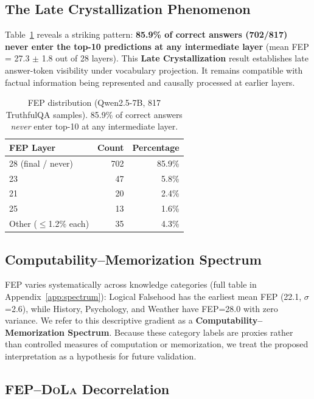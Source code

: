 \documentclass[11pt]{article}
\newcommand{\dola}{\textsc{DoLa}}
\begin{document}
\subsection{The Late Crystallization Phenomenon}

Table~\ref{tab:fep_distribution} reveals a striking pattern: \textbf{85.9\% of correct answers (702/817) never enter the top-10 predictions at any intermediate layer} (mean FEP = 27.3 $\pm$ 1.8 out of 28 layers). This \textbf{Late Crystallization} result establishes late answer-token visibility under vocabulary projection. It remains compatible with factual information being represented and causally processed at earlier layers.

\begin{table}[t]
\centering
\small
\begin{tabular}{lrr}
\toprule
\textbf{FEP Layer} & \textbf{Count} & \textbf{Percentage} \\
\midrule
28 (final / never) & 702 & 85.9\% \\
23 & 47 & 5.8\% \\
21 & 20 & 2.4\% \\
25 & 13 & 1.6\% \\
Other ($\leq$1.2\% each) & 35 & 4.3\% \\
\bottomrule
\end{tabular}
\caption{FEP distribution (Qwen2.5-7B, 817 TruthfulQA samples). 85.9\% of correct answers \emph{never} enter top-10 at any intermediate layer.}
\label{tab:fep_distribution}
\end{table}

\subsection{Computability--Memorization Spectrum}
\label{sec:spectrum}

FEP varies systematically across knowledge categories (full table in Appendix~\ref{app:spectrum}): Logical Falsehood has the earliest mean FEP (22.1, $\sigma$=2.6), while History, Psychology, and Weather have FEP=28.0 with zero variance. We refer to this descriptive gradient as a \textbf{Computability--Memorization Spectrum}. Because these category labels are proxies rather than controlled measures of computation or memorization, we treat the proposed interpretation as a hypothesis for future validation.

\subsection{FEP--\dola{} Decorrelation}
\label{sec:fep_dola}
\end{document}
